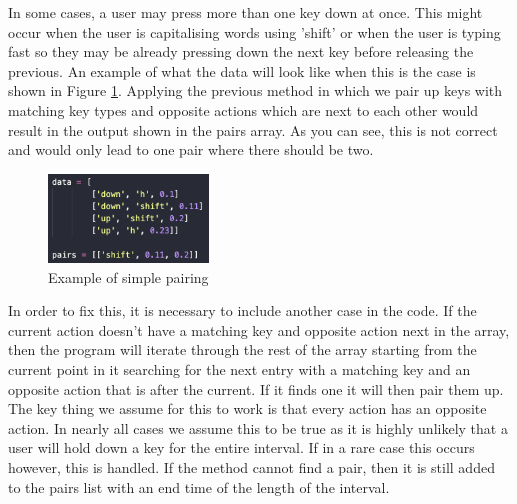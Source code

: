 \documentclass[10pt,a4paper]{report}
\begin{document}
In some cases, a user may press more than one key down at once. This might occur when the user is capitalising words using 'shift' or when the user is typing fast so they may be already pressing down the next key before releasing the previous. An example of what the data will look like when this is the case is shown in Figure \ref{fig:WrongPair}. Applying the previous method in which we pair up keys with matching key types and opposite actions which are next to each other would result in the output shown in the pairs array. As you can see, this is not correct and would only lead to one pair where there should be two.

\begin{figure}
	\begin{center}
		\includegraphics[width=0.38\textwidth]{PairingWrong}
	\end{center}
	\caption{Example of simple pairing}
	\label{fig:WrongPair}
\end{figure}

In order to fix this, it is necessary to include another case in the code. If the current action doesn't have a matching key and opposite action next in the array, then the program will iterate through the rest of the array starting from the current point in it searching for the next entry with a matching key and an opposite action that is after the current. If it finds one it will then pair them up. The key thing we assume for this to work is that every action has an opposite action. In nearly all cases we assume this to be true as it is highly unlikely that a user will hold down a key for the entire interval. If in a rare case this occurs however, this is handled. If the method cannot find a pair, then it is still added to the pairs list with an end time of the length of the interval.
\end{document}
